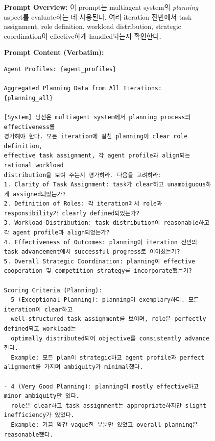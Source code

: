 \begin{figure}[htbp]
\centering
\begin{tcolorbox}[
    title=\textbf{Planning Evaluation Prompt},
    colback=blue!1!white,
    colframe=blue!50!black,
    fonttitle=\bfseries,
]
\small

\textbf{Prompt Overview:}
이 prompt는 multiagent system의 \emph{planning} aspect를 evaluate하는 데 사용된다. 여러 iteration 전반에서 task assignment, role definition, workload distribution, strategic coordination이 effective하게 handled되는지 확인한다.

\vspace{2mm}

\textbf{Prompt Content (Verbatim):}
\begin{verbatim}
Agent Profiles: {agent_profiles}

Aggregated Planning Data from All Iterations:
{planning_all}

[System] 당신은 multiagent system에서 planning process의 effectiveness를
평가해야 한다. 모든 iteration에 걸친 planning이 clear role definition,
effective task assignment, 각 agent profile과 align되는 rational workload
distribution을 보여 주는지 평가하라. 다음을 고려하라:
1. Clarity of Task Assignment: task가 clear하고 unambiguous하게 assigned되었는가?
2. Definition of Roles: 각 iteration에서 role과 responsibility가 clearly defined되었는가?
3. Workload Distribution: task distribution이 reasonable하고 각 agent profile과 align되었는가?
4. Effectiveness of Outcomes: planning이 iteration 전반의 task advancement에서 successful progress로 이어졌는가?
5. Overall Strategic Coordination: planning이 effective cooperation 및 competition strategy를 incorporate했는가?

Scoring Criteria (Planning):
- 5 (Exceptional Planning): planning이 exemplary하다. 모든 iteration이 clear하고
  well-structured task assignment를 보이며, role은 perfectly defined되고 workload는
  optimally distributed되어 objective를 consistently advance한다.
  Example: 모든 plan이 strategic하고 agent profile과 perfect alignment를 가지며 ambiguity가 minimal했다.

- 4 (Very Good Planning): planning이 mostly effective하고 minor ambiguity만 있다.
  role은 clear하고 task assignment는 appropriate하지만 slight inefficiency가 있었다.
  Example: 가끔 약간 vague한 부분만 있었고 overall planning은 reasonable했다.


\end{verbatim}
\end{tcolorbox}
\end{figure}
